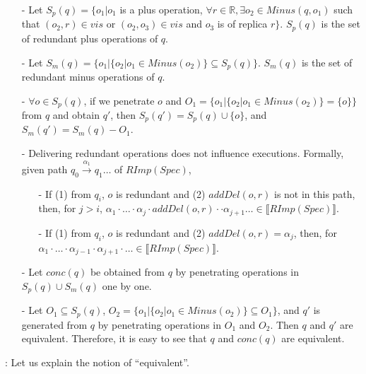 \begin{itemize}
\setlength{\itemsep}{0.5pt}
\item[-] Let $S_p(q) = \{ o_1 \vert o_1$ is a plus operation, $\forall r \in \mathbb{R}, \exists o_2 \in Minus(q,o_1)$ such that $(o_2,r) \in vis$ or $(o_2,o_3) \in vis$ and $o_3$ is of replica $r\}$. $S_p(q)$ is the set of redundant plus operations of $q$.

\item[-] Let $S_m(q) = \{ o_1 \vert  \{ o_2 \vert o_1 \in Minus(o_2) \} \subseteq S_p(q) \}$. $S_m(q)$ is the set of redundant minus operations of $q$.

\item[-] $\forall o \in S_p(q)$, if we penetrate $o$ and $O_1 = \{ o_1 \vert  \{ o_2 \vert o_1 \in Minus(o_2) \} = \{o\} \}$ from $q$ and obtain $q'$, then $S_p(q') = S_p(q) \cup \{ o \}$, and $S_m(q')= S_m(q) - O_1$.

\item[-] Delivering redundant operations does not influence executions. Formally, given path $q_0 {\xrightarrow{\alpha_1}} q_1 \ldots$ of $RImp(Spec)$,

    \begin{itemize}
    \setlength{\itemsep}{0.5pt}
    \item[-] If (1) from $q_i$, $o$ is redundant and (2) $addDel(o,r)$ is not in this path, then, for $j>i$, $\alpha_1 \cdot \ldots \cdot \alpha_j \cdot addDel(o,r) \cdot \cdot \alpha_{j+1} \ldots \in \llbracket RImp(Spec) \rrbracket$.

    \item[-] If (1) from $q_i$, $o$ is redundant and (2) $addDel(o,r)=\alpha_j$, then, for $\alpha_1 \cdot \ldots \cdot \alpha_{j-1} \cdot \alpha_{j+1} \cdot \ldots \in \llbracket RImp(Spec) \rrbracket$.
    \end{itemize}

\item[-] Let $conc(q)$ be obtained from $q$ by penetrating operations in $S_p(q) \cup S_m(q)$ one by one.

\item[-] Let $O_1 \subseteq S_p(q)$, $O_2 = \{ o_1 \vert  \{ o_2 \vert o_1 \in Minus(o_2) \} \subseteq O_1 \}$, and $q'$ is generated from $q$ by penetrating operations in $O_1$ and $O_2$. Then $q$ and $q'$ are equivalent. Therefore, it is easy to see that $q$ and $conc(q)$ are equivalent.
\end{itemize}

: Let us explain the notion of ``equivalent''.

